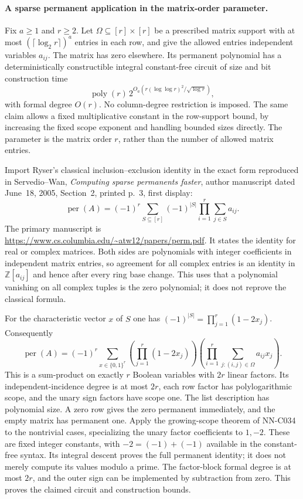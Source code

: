 \paragraph{A sparse permanent application in the matrix-order parameter.}
Fix $a\ge1$ and $r\ge2$.  Let $\Omega\subseteq[r]\times[r]$ be a prescribed
matrix support with at most $(\lceil\log_2 r\rceil)^a$ entries in
each row, and give the allowed entries independent variables
$a_{ij}$.  The matrix has zero elsewhere.  Its permanent polynomial
has a deterministically constructible integral constant-free circuit
of size and bit construction time
\[
 \operatorname{poly}(r)\,
       2^{O_a(r(\log\log r)^2/\sqrt{\log r})},
\]
with formal degree $O(r)$.  No column-degree restriction is imposed.
The same claim allows a fixed multiplicative constant in the
row-support bound, by increasing the fixed scope exponent and
handling bounded sizes directly.  The parameter is the matrix
order $r$, rather than the number of allowed matrix entries.

Import Ryser's classical inclusion--exclusion identity in the
exact form reproduced in Servedio--Wan, \emph{Computing sparse
permanents faster}, author manuscript dated June~18, 2005,
Section~2, printed p.~3, first display:
\[
 \operatorname{per}(A)=(-1)^r\sum_{S\subseteq[r]}(-1)^{|S|}
                          \prod_{i=1}^r\sum_{j\in S}a_{ij}.
\]
The primary manuscript is
\url{https://www.cs.columbia.edu/~atw12/papers/perm.pdf}.
It states the identity for real or complex matrices.  Both sides
are polynomials with integer coefficients in independent matrix
entries, so agreement for all complex entries is an identity in
$\mathbb Z[a_{ij}]$ and hence after every ring base change.
This uses that a polynomial vanishing on all complex tuples is
the zero polynomial; it does not reprove the classical formula.

For the characteristic vector $x$ of $S$ one has
$(-1)^{|S|}=\prod_{j=1}^r(1-2x_j)$.  Consequently
\[
 \operatorname{per}(A)=(-1)^r
 \sum_{x\in\{0,1\}^r}
       \left(\prod_{j=1}^r(1-2x_j)\right)
       \left(\prod_{i=1}^r\sum_{j:(i,j)\in\Omega}a_{ij}x_j\right).
\]
This is a sum-product on exactly $r$ Boolean variables with $2r$
linear factors.  Its independent-incidence degree is at most
$2r$, each row factor has polylogarithmic scope, and the unary
sign factors have scope one.  The list description has polynomial
size.  A zero row gives the zero permanent immediately, and the
empty matrix has permanent one.  Apply the growing-scope theorem
of NN-C034 to the nontrivial cases, specializing the unary factor
coefficients to $1,-2$.  These are fixed integer constants, with
$-2=(-1)+(-1)$ available in the constant-free syntax.  Its integral
descent proves the full permanent identity; it does not merely
compute its values modulo a prime.  The factor-block formal degree
is at most $2r$, and the outer sign can be implemented by subtraction
from zero.  This proves the claimed circuit and construction bounds.

